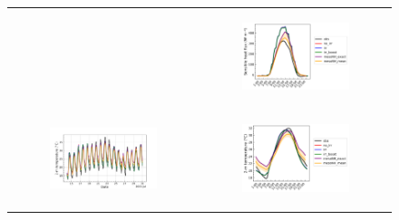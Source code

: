 \begin{figure}[hbtp]
\begin{tabular}{cc}
\begin{subfigure}[t]{0.5\textwidth}
        \end{subfigure} &
        \begin{subfigure}[t]{0.5\textwidth}
            \caption{}
            \includegraphics[width=\textwidth]{images/chap5/SOP_TS_DC/diurnal_cycle_elsplans_sens.png}
        \end{subfigure} \\
        \begin{subfigure}[t]{0.5\textwidth}
            \caption{}
            \includegraphics[width=\textwidth]{images/chap5/SOP_TS_DC/time_series_elsplans_t2m.png}
        \end{subfigure} &
        \begin{subfigure}[t]{0.5\textwidth}
            \caption{}
            \includegraphics[width=\textwidth]{images/chap5/SOP_TS_DC/diurnal_cycle_elsplans_t2m.png}

\end{subfigure}
\end{tabular}
\end{figure}

